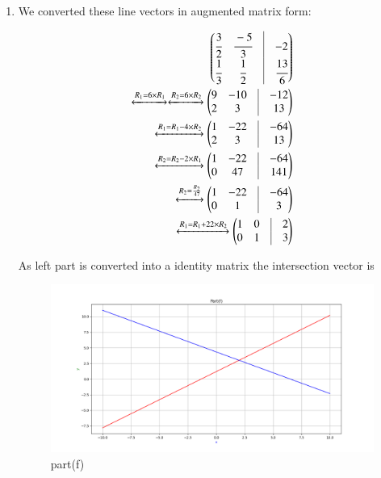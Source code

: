 \begin{enumerate}
\item We converted these line vectors in augmented matrix form: 

\begin{align}
    \myvec{\cfrac{3}{2} & \cfrac{-5}{3} & \vrule & -2\\\cfrac{1}{3} & \cfrac{1}{2} & \vrule & \cfrac{13}{6}}
\\
    \xleftrightarrow[]{R_{1}=6\times R_{1}}
    \xleftrightarrow[]{R_{2}=6\times R_{2}} \myvec{9 & -10 & \vrule & -12\\2 & 3 & \vrule & 13}
\\
    \xleftrightarrow[]{R_{1}=R_{1}-4\times R_{2}} \myvec{1 & -22 & \vrule & -64\\2 & 3 & \vrule & 13}
\\
    \xleftrightarrow[]{R_{2}=R_{2}-2\times R_{1}}  \myvec{1 & -22 & \vrule & -64\\0 & 47 & \vrule & 141}
\\
    \xleftrightarrow[]{R_{2}=\frac{R_{2}}{47}}  \myvec{1 & -22 & \vrule & -64\\0 & 1 & \vrule & 3}
\\
    \xleftrightarrow[]{R_{1}=R_{1}+22\times R_{2}} \myvec{1 & 0 & \vrule & 2\\0 & 1 & \vrule & 3}
\end{align}

As left part is converted into a identity matrix the intersection vector is 


\begin{figure}[!ht]
    \centering
    \includegraphics[width=\columnwidth]{./solutions/line_plane/18/figures//A1_partf}
\caption{part(f)}
\label{fig:solutions/line_plane/18/ part(f)}
\end{figure}

\end{enumerate}



